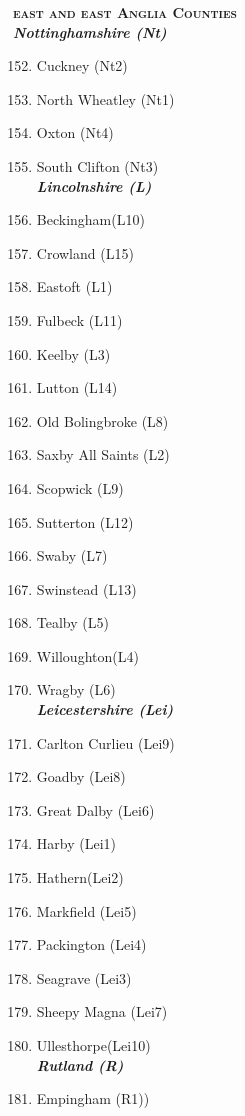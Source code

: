 \begin{refsection}
	\textbf{\textsc{east and east Anglia Counties}} \\
	\emph{\textbf{Nottinghamshire (Nt)}}
	  \begin{multicols}{2}
		\begin{enumerate}\setcounter{enumi}{151}
		\item Cuckney (Nt2)
		\item North Wheatley (Nt1)
		\item Oxton (Nt4)
		\item South Clifton (Nt3)\\
		\emph{\textbf{Lincolnshire (L)}}
		\item Beckingham(L10)
		\item Crowland (L15)
		\item Eastoft (L1)
		\item Fulbeck (L11)
		\item Keelby (L3)
		\item Lutton (L14)
		\item Old Bolingbroke (L8)
		\item Saxby All Saints (L2)
		\item Scopwick (L9)
		\item Sutterton (L12)
		\item Swaby (L7)
		\item Swinstead (L13)
		\item Tealby (L5)
		\item Willoughton(L4)
		\item Wragby (L6)\\
		\emph{\textbf{Leicestershire (Lei)}}
		\item Carlton Curlieu (Lei9)
		\item Goadby (Lei8)
		\item Great Dalby (Lei6)
		\item Harby (Lei1)
		\item Hathern(Lei2)
		\item Markfield (Lei5)
		\item Packington (Lei4)
		\item Seagrave (Lei3)
		\item Sheepy Magna (Lei7)
		\item Ullesthorpe(Lei10)\\
		\emph{\textbf{Rutland (R)}}
		\item Empingham (R1))

\end{enumerate}
\end{multicols}
\end{refsection}
